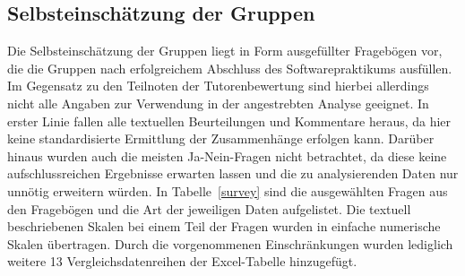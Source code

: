 \documentclass[da,ngerman]{stthesis}
\begin{document}
  			\subsection{Selbsteinschätzung der Gruppen}
  				Die Selbsteinschätzung der Gruppen liegt in Form ausgefüllter Fragebögen vor, die die Gruppen nach erfolgreichem Abschluss des Softwarepraktikums ausfüllen. Im Gegensatz zu den Teilnoten der Tutorenbewertung sind hierbei allerdings nicht alle Angaben zur Verwendung in der angestrebten Analyse geeignet. In erster Linie fallen alle textuellen Beurteilungen und Kommentare heraus, da hier keine standardisierte Ermittlung der Zusammenhänge erfolgen kann. Darüber hinaus wurden auch die meisten Ja-Nein-Fragen nicht betrachtet, da diese keine aufschlussreichen Ergebnisse erwarten lassen und die zu analysierenden Daten nur unnötig erweitern würden. In Tabelle~\ref{survey} sind die ausgewählten Fragen aus den Fragebögen und die Art der jeweiligen Daten aufgelistet. Die textuell beschriebenen Skalen bei einem Teil der Fragen wurden in einfache numerische Skalen übertragen. Durch die vorgenommenen Einschränkungen wurden lediglich weitere 13 Vergleichsdatenreihen der Excel-Tabelle hinzugefügt.
\end{document}
